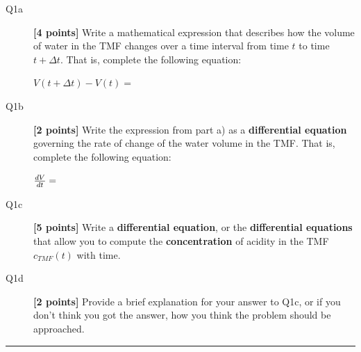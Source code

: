 \documentclass{article}
\begin{document}
\begin{description}
\item [Q1a] \textbf{[4 points]} Write a mathematical expression that describes how the volume of water in the TMF changes over a time interval from time $t$ to time $t+\Delta t$. That is, complete the following equation: 

$ V(t+\Delta t) - V(t) =$
\vspace{1.0cm}

\item [Q1b] \textbf{[2 points]}  Write the expression from part a) as a \textbf{differential equation} governing the rate of change of the water volume in the TMF. That is, complete the following equation:

${dV\over dt}=$
\vspace{1.5cm}

\item [Q1c] \textbf{[5 points]}   Write a \textbf{differential equation}, or the \textbf{differential equations} that allow you to compute the \textbf{concentration} of acidity in the TMF $c_{TMF}(t)$ with time. 
\vspace{2.5cm}
\item [Q1d] \textbf{[2 points]} Provide a brief explanation for your answer to Q1c, or if you don't think you got the answer, how you think the problem should be approached.
\vspace{1.5cm}



\end{description}


\rule{\textwidth}{1pt}
\end{document}
